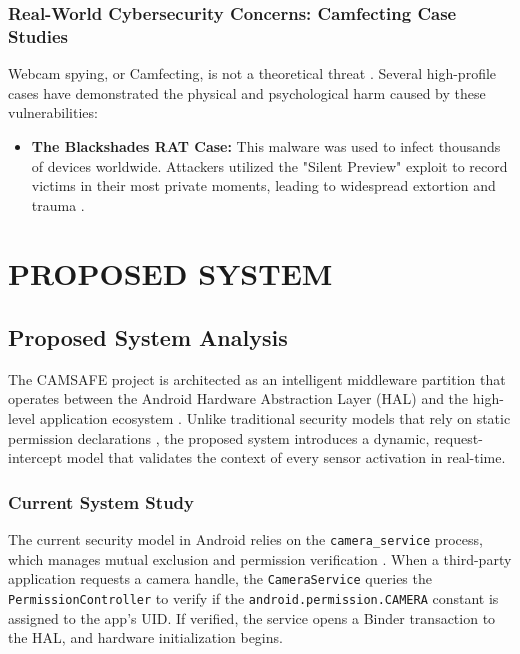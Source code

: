 \documentclass[12pt,a4paper]{report}
\begin{document}
\begin{enumerate}
    \subsection{Real-World Cybersecurity Concerns: Camfecting Case Studies}
    Webcam spying, or Camfecting, is not a theoretical threat \cite{checkmarx}. Several high-profile cases have demonstrated the physical and psychological harm caused by these vulnerabilities:
    \begin{itemize}
        \item \textbf{The Blackshades RAT Case:} This malware was used to infect thousands of devices worldwide. Attackers utilized the "Silent Preview" exploit to record victims in their most private moments, leading to widespread extortion and trauma \cite{malwaresurvey}.
    \end{itemize}


    \chapter{PROPOSED SYSTEM}

    \section{Proposed System Analysis}
    The CAMSAFE project is architected as an intelligent middleware partition that operates between the Android Hardware Abstraction Layer (HAL) and the high-level application ecosystem \cite{androidhal}. Unlike traditional security models that rely on static permission declarations \cite{malwaresurvey}, the proposed system introduces a dynamic, request-intercept model that validates the context of every sensor activation in real-time.

    \subsection{Current System Study}
    The current security model in Android relies on the \texttt{camera\_service} process, which manages mutual exclusion and permission verification \cite{androidhal}. When a third-party application requests a camera handle, the \texttt{CameraService} queries the \texttt{PermissionController} to verify if the \texttt{android.permission.CAMERA} constant is assigned to the app's UID. If verified, the service opens a Binder transaction to the HAL, and hardware initialization begins.


\end{enumerate}
\end{document}
